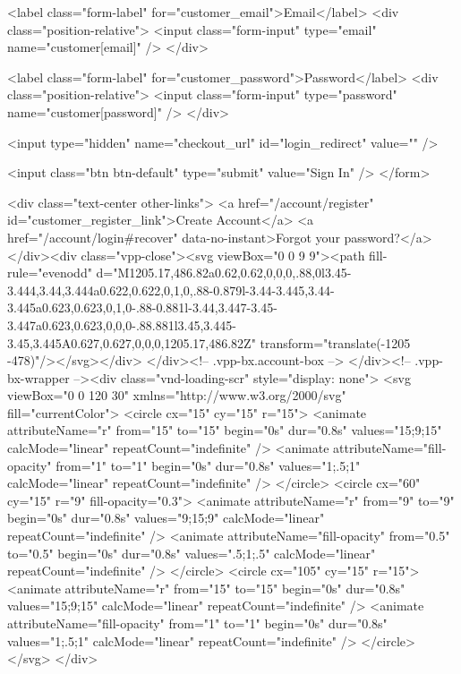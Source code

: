 {{{{{{{        

        <label class="form-label" for="customer_email">Email</label>
        <div class="position-relative">
          <input class="form-input" type="email" name="customer[email]" />
        </div>

        <label class="form-label" for="customer_password">Password</label>
        <div class="position-relative">
          <input class="form-input" type="password" name="customer[password]" />
        </div>

        <input type="hidden" name="checkout_url" id="login_redirect" value="" />

        <input class="btn btn-default" type="submit" value="Sign In" />
      </form>

      <div class="text-center other-links">
        <a href="/account/register" id="customer_register_link">Create Account</a>
        <a href="/account/login#recover" data-no-instant>Forgot your password?</a>
      </div><div class="vpp-close"><svg viewBox="0 0 9 9"><path fill-rule="evenodd" d="M1205.17,486.82a0.62,0.62,0,0,0,.88,0l3.45-3.444,3.44,3.444a0.622,0.622,0,1,0,.88-0.879l-3.44-3.445,3.44-3.445a0.623,0.623,0,1,0-.88-0.881l-3.44,3.447-3.45-3.447a0.623,0.623,0,0,0-.88.881l3.45,3.445-3.45,3.445A0.627,0.627,0,0,0,1205.17,486.82Z" transform="translate(-1205 -478)"/></svg></div>
</div><!-- .vpp-bx.account-box -->
</div><!-- .vpp-bx-wrapper --><div class="vnd-loading-scr" style="display: none">
<svg viewBox="0 0 120 30" xmlns="http://www.w3.org/2000/svg" fill="currentColor">
<circle cx="15" cy="15" r="15">
<animate attributeName="r" from="15" to="15"
begin="0s" dur="0.8s"
values="15;9;15" calcMode="linear"
repeatCount="indefinite" />
<animate attributeName="fill-opacity" from="1" to="1"
begin="0s" dur="0.8s"
values="1;.5;1" calcMode="linear"
repeatCount="indefinite" />
</circle>
<circle cx="60" cy="15" r="9" fill-opacity="0.3">
<animate attributeName="r" from="9" to="9"
begin="0s" dur="0.8s"
values="9;15;9" calcMode="linear"
repeatCount="indefinite" />
<animate attributeName="fill-opacity" from="0.5" to="0.5"
begin="0s" dur="0.8s"
values=".5;1;.5" calcMode="linear"
repeatCount="indefinite" />
</circle>
<circle cx="105" cy="15" r="15">
<animate attributeName="r" from="15" to="15"
begin="0s" dur="0.8s"
values="15;9;15" calcMode="linear"
repeatCount="indefinite" />
<animate attributeName="fill-opacity" from="1" to="1"
begin="0s" dur="0.8s"
values="1;.5;1" calcMode="linear"
repeatCount="indefinite" />
</circle>
</svg>
</div>

}}}}}}}
